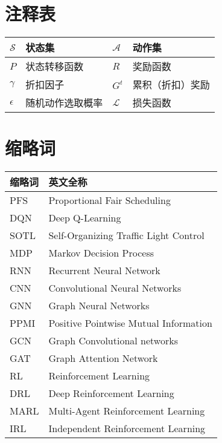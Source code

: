 
\chapter*{注释表}

\noindent\begin{tabu} to \hline

$\mathcal{S}$ & 状态集 & $\mathcal{A}$ & 动作集 \\ \hline
$P$ & 状态转移函数 & $R$ & 奖励函数 \\ \hline
$\gamma$ & 折扣因子 & $G^{t}$ & 累积（折扣）奖励 \\  \hline
$\epsilon$ & 随机动作选取概率 & $\mathcal{L}$ & 损失函数 \\ \hline
\end{tabu}

\chapter*{缩略词}

\noindent\begin{tabu} to \textwidth {|X[1,c]|X[4,c]|}\hline
缩略词 & 英文全称 \\ \hline
PFS & Proportional Fair Scheduling \\ \hline
DQN & Deep Q-Learning \\ \hline
SOTL & Self-Organizing Traffic Light Control \\ \hline
MDP & Markov Decision Process \\ \hline
RNN & Recurrent Neural Network \\ \hline
CNN & Convolutional Neural Networks \\ \hline
GNN & Graph Neural Networks \\ \hline
PPMI & Positive Pointwise Mutual Information \\ \hline
GCN & Graph Convolutional networks \\ \hline
GAT & Graph Attention Network \\ \hline
RL & Reinforcement Learning \\ \hline
DRL & Deep Reinforcement Learning \\ \hline
MARL & Multi-Agent Reinforcement Learning \\ \hline
IRL & Independent Reinforcement Learning \\ \hline
\end{tabu}
